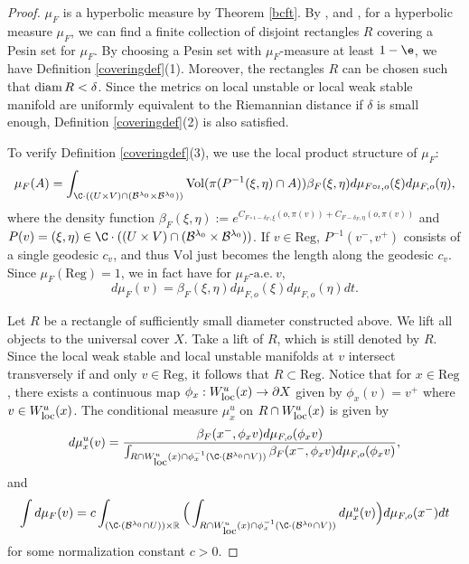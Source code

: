 \documentclass[11pt]{amsart}
\theoremstyle{definition}
\newcommand{\BBB}{\mathcal{B}}
\def\pX{{\partial X}}
\def\RR{{\mathbb R}}
\def\diam{\mathop{\hbox{{\rm diam}}}}
\def\diam{\mathop{\hbox{{\rm diam}}}}
\def\loc{{\mathop{\hbox{\footnotesize  \rm loc}}}}
\def\b{\beta}
\def\d{\delta}   %
\def\l{\lambda}   \def\L{\Lambda}
\def\ae{\text{-a.e.}\ }
\begin{document}
\begin{proof}
$\mu_F$ is a hyperbolic measure by Theorem \ref{bcft}. By \cite[Lemma 8.3]{Pe1}, \cite[Lemma 1.8]{Pe2} and \cite[Lemma 9.5.7]{BP}, for a hyperbolic measure $\mu_F$, we can find a finite
collection of disjoint rectangles $R$ covering a Pesin set for $\mu_F$. By choosing a Pesin set with $\mu_F$-measure at least $1-\e$, we have Definition \ref{coveringdef}(1). Moreover, the rectangles $R$ can be chosen such that $\diam R<\d$. Since the metrics on local unstable or local weak stable manifold are uniformly equivalent to the Riemannian distance if $\d$ is small enough, Definition \ref{coveringdef}(2) is also satisfied.

To verify Definition \ref{coveringdef}(3), we use the local product structure of $\mu_F$:
\begin{equation*}
\mu_{F}(A)=\int_{\C\cdot((U\times V)\cap (\BBB^{\l_0}\times \BBB^{\l_0}))} \text{Vol}(\pi(P^{-1}(\xi,\eta)\cap A)) \b_F(\xi,\eta)d\mu_{F\circ \iota,o}(\xi) d\mu_{F,o}(\eta),
\end{equation*}
where the density function $\b_F(\xi,\eta):=e^{C_{F\circ \iota-\d_F,\xi}(o, \pi(v))+C_{F-\d_F,\eta}(o, \pi(v))}$ and $P(v)=(\xi,\eta)\in \C\cdot((U\times V)\cap (\BBB^{\l_0}\times \BBB^{\l_0}))$.
If $v\in \text{Reg}$, $P^{-1}(v^-, v^+)$ consists of a single geodesic $c_v$, and thus $\text{Vol}$ just becomes the length along the geodesic $c_v$. Since $\mu_F(\text{Reg}) = 1$, we in fact have for $\mu_F \ae v$,
$$d\mu_F(v)=\b_F(\xi, \eta)d\mu_{F,o} (\xi)d\mu_{F,o} (\eta)dt.$$


Let $R$ be a rectangle of sufficiently small diameter constructed above. We lift all objects to the universal cover $X$. Take a lift of $R$, which is still denoted by $R$. Since the local weak stable
and local unstable manifolds at $v$ intersect transversely if and only $v\in \text{Reg}$, it follows
that $R\subset \text{Reg}$. Notice that for $x\in \text{Reg}$, there exists a continuous map $\phi_x: W_\loc^u(x)\to \pX$ given by $\phi_x(v)=v^+$ where $v\in W_\loc^u(x)$. The conditional measure $\mu^u_x$ on $R\cap W_\loc^u(x)$ is given by
\begin{equation}\label{conditional}
d\mu^u_x(v) = \frac{\b_F(x^-,\phi_xv) d\mu_{F,o}(\phi_xv)}{\int_{R\cap W_\loc^u(x)\cap \phi_x^{-1}(\C\cdot(\BBB^{\l_0}\cap V))}\b_F(x^-,\phi_xv) d\mu_{F,o} (\phi_xv)}, 
\end{equation}
and $$\int d \mu_F(v)=c\int_{(\C\cdot(\BBB^{\l_0}\cap U))\times \RR}\Big(\int_{R\cap W_\loc^u(x)\cap \phi_x^{-1}(\C\cdot(\BBB^{\l_0}\cap V))} d\mu^u_x(v)\Big) d\mu_{F,o} (x^-)dt$$
for some normalization constant $c>0$. 


\end{proof}
\end{document}
